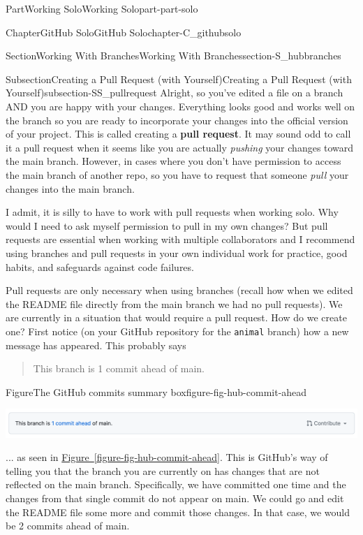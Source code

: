 \documentclass[oneside,10pt,]{book}
\newcommand{\xreffont}{\relax}
\newcommand{\mono}[1]{\texttt{#1}}
\newcommand{\terminology}[1]{\textbf{#1}}
\begin{document}
\begin{partptx}{Part}{Working Solo}{}{Working Solo}{}{}{part-part-solo}
\begin{chapterptx}{Chapter}{GitHub Solo}{}{GitHub Solo}{}{}{chapter-C_githubsolo}
\begin{sectionptx}{Section}{Working With Branches}{}{Working With Branches}{}{}{section-S_hubbranches}
\typeout{************************************************}
%
\begin{subsectionptx}{Subsection}{Creating a Pull Request (with Yourself)}{}{Creating a Pull Request (with Yourself)}{}{}{subsection-SS_pullrequest}
%
%
%
%
Alright, so you've edited a file on a branch AND you are happy with your changes. Everything looks good and works well on the branch so you are ready to incorporate your changes into the official version of your project. This is called creating a \terminology{pull request}. It may sound odd to call it a pull request when it seems like you are actually \emph{pushing} your changes toward the main branch. However, in cases where you don't have permission to access the main branch of another repo, so you have to request that someone \emph{pull} your changes into the main branch.%
\par
I admit, it is silly to have to work with pull requests when working solo. Why would I need to ask myself permission to pull in my own changes? But pull requests are essential when working with multiple collaborators and I recommend using branches and pull requests in your own individual work for practice, good habits, and safeguards against code failures.%
\par
{} Pull requests are only necessary when using branches (recall how when we edited the README file directly from the main branch we had no pull requests). We are currently in a situation that would require a pull request. How do we create one? First notice (on your GitHub repository for the \mono{animal} branch) how a new message has appeared. This probably says%
\begin{quote}%
This branch is 1 commit ahead of main.%
\end{quote}
\begin{figureptx}{Figure}{The GitHub commits summary box}{figure-fig-hub-commit-ahead}{}%
\begin{image}{0.05}{0.9}{0.05}{}%
\includegraphics[width=\linewidth]{external/hub_commit_ahead.pdf}
\end{image}%
\tcblower
\end{figureptx}%
... as seen in \hyperref[figure-fig-hub-commit-ahead]{Figure~{\xreffont\ref{figure-fig-hub-commit-ahead}}}. This is GitHub's way of telling you that the branch you are currently on has changes that are not reflected on the main branch. Specifically, we have committed one time and the changes from that single commit do not appear on main. We could go and edit the README file some more and commit those changes. In that case, we would be 2 commits ahead of main.%

\end{subsectionptx}
\end{sectionptx}
\end{chapterptx}
\end{partptx}
\end{document}
